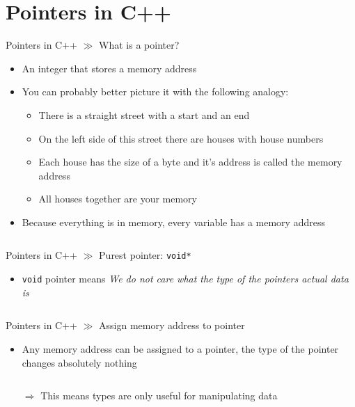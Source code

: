 \documentclass[10pt]{beamer}
\begin{document}
\section{Pointers in C++}

\begin{frame}{Pointers in C++ $\gg$ What is a pointer?}
\begin{itemize}
	\item An integer that stores a memory address
	\item You can probably better picture it with the following analogy:
	\begin{itemize}
		\item There is a straight street with a start and an end
		\item On the left side of this street there are houses with house numbers
		\item Each house has the size of a byte and it's address is called the memory address
		\item All houses together are your memory
	\end{itemize}
	\item Because everything is in memory, every variable has a memory address
	\inputminted[bgcolor=lightGreyCustom,fontsize=\scriptsize]{cpp}{./resources/memory_address.cpp}
\end{itemize}
\end{frame}

\begin{frame}{Pointers in C++ $\gg$ Purest pointer: \texttt{void*}}
\begin{itemize}
	\item \texttt{void} pointer means \textit{We do not care what the type of the pointers actual data is}
	\inputminted[bgcolor=lightGreyCustom,fontsize=\scriptsize]{cpp}{./resources/void_ptr.cpp}
\end{itemize}
\end{frame}

\begin{frame}{Pointers in C++ $\gg$ Assign memory address to pointer}
\begin{itemize}
	\item Any memory address can be assigned to a pointer, the type of the pointer changes absolutely nothing
	\inputminted[bgcolor=lightGreyCustom,fontsize=\scriptsize]{cpp}{./resources/assign_ptr.cpp}
	\item[$\Rightarrow$] This means types are only useful for manipulating data
\end{itemize}
\end{frame}
\end{document}
